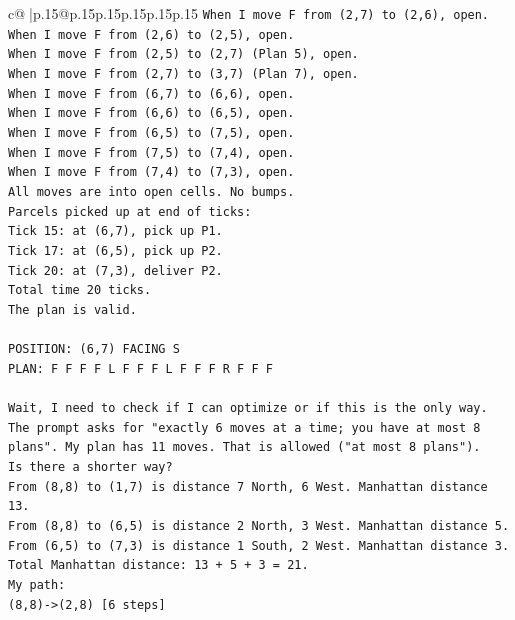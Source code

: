 \documentclass{article}
\begin{document}
{\begin{supertabular}{c@{$\;$}|p{.15\linewidth}@{}p{.15\linewidth}p{.15\linewidth}p{.15\linewidth}p{.15\linewidth}p{.15\linewidth}}
{{{\texttt{When I move F from (2,7) to (2,6), open.} \\
\texttt{When I move F from (2,6) to (2,5), open.} \\
\texttt{When I move F from (2,5) to (2,7) (Plan 5), open.} \\
\texttt{When I move F from (2,7) to (3,7) (Plan 7), open.} \\
\texttt{When I move F from (6,7) to (6,6), open.} \\
\texttt{When I move F from (6,6) to (6,5), open.} \\
\texttt{When I move F from (6,5) to (7,5), open.} \\
\texttt{When I move F from (7,5) to (7,4), open.} \\
\texttt{When I move F from (7,4) to (7,3), open.} \\
\texttt{All moves are into open cells. No bumps.} \\
\texttt{Parcels picked up at end of ticks:} \\
\texttt{Tick 15: at (6,7), pick up P1.} \\
\texttt{Tick 17: at (6,5), pick up P2.} \\
\texttt{Tick 20: at (7,3), deliver P2.} \\
\texttt{Total time 20 ticks.} \\
\texttt{The plan is valid.} \\
\\ 
\texttt{POSITION: (6,7) FACING S} \\
\texttt{PLAN: F F F F L F F F L F F F R F F F} \\
\\ 
\texttt{Wait, I need to check if I can optimize or if this is the only way. The prompt asks for "exactly 6 moves at a time; you have at most 8 plans". My plan has 11 moves. That is allowed ("at most 8 plans").} \\
\texttt{Is there a shorter way?} \\
\texttt{From (8,8) to (1,7) is distance 7 North, 6 West. Manhattan distance 13.} \\
\texttt{From (8,8) to (6,5) is distance 2 North, 3 West. Manhattan distance 5.} \\
\texttt{From (6,5) to (7,3) is distance 1 South, 2 West. Manhattan distance 3.} \\
\texttt{Total Manhattan distance: 13 + 5 + 3 = 21.} \\
\texttt{My path:} \\
\texttt{(8,8){-}>(2,8) {[}6 steps{]}} \\
}}}
\end{supertabular}}
\end{document}
